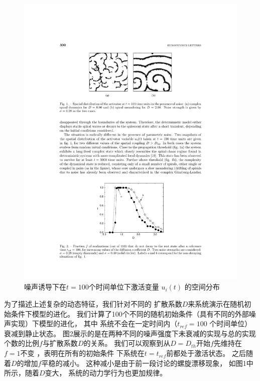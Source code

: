 \documentclass[
bachelor,
nofont, %
pdflinks,
]{xjtuthesis}
\begin{document}
\begin{figure}[!ht]
\centering
\includegraphics[scale=1]{fig1.pdf}
\caption{噪声诱导下在$t = 100$个时间单位下激活变量 $u_i(t)$ 的空间分布}
\end{figure}

\medskip
为了描述上述复杂的动态特征，我们针对不同的
扩散系数$D$来系统演示在随机初始条件下模型的进化。 我们计算了100个不同的随机初始条件（具有不同的外部噪声实现）下模型的进化， 其中
系统不会在一定时间内（$t_{ref} = 100$
个时间单位）衰减到静⽌状态。 图2展示的是在两种不同的噪声强度下未衰减的实现与总的实现个数的比例$f$与扩散系数$D$的关系。 我们可以观察到从$D = D_{th}$开始$f$先维持在 $f = 1$不变 ，表明在所有的初始条件
下系统在$t=t_{ref}$前都处于激活状态。 之后随着$D$的增加$f$平稳的减小。 这种减小是由于前⼀段讨论的螺旋漂移现象，
如图1中所示，随着$D$变⼤， 系统的动力学行为也更加规律。
\end{document}
